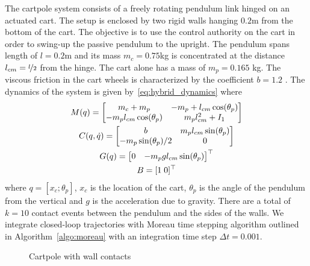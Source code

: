 The cartpole system consists of a freely rotating pendulum link hinged on an
actuated cart.
%
The setup is enclosed by two rigid walls hanging $0.2$m from the bottom of the
cart.
%
The objective is to use the control authority on the cart in order to swing-up
the passive pendulum to the upright.
%
The pendulum spans length of $l=0.2$m and its mass $m_c = 0.75$kg is
concentrated at the distance $l_{cm}=\nicefrac{l}{2}$ from the hinge.
%
The cart alone has a mass of $m_p=0.165$ kg. The viscous friction in the cart
wheels is characterized by the coefficient $b=1.2$ .
%
The dynamics of the system
is given by~\eqref{eq:hybrid_dynamics} where 
\begin{equation}
    \begin{gathered}
        M(q) = \begin{bmatrix}m_c + m_p & -m_p+l_{cm} \cos(\theta_p) \\
        -m_pl_{cm}\cos(\theta_p) & m_p l_{cm}^2+I_1\end{bmatrix} \\
        C(q, \dot{q}) = \begin{bmatrix}b  & m_pl_{cm}\sin(\theta_p) \\
                -m_p\sin(\theta_p)/2 & 0\end{bmatrix} \\
        G(q) = \begin{bmatrix}0 & -m_pg l_{cm} \sin(\theta_p)\end{bmatrix}^\top \\
        B = [1 \; 0]^\top
    \end{gathered}
\end{equation}
\noindent where $q = [x_c; \theta_p]$, $x_c$ is the location of the cart, $\theta_p$
is the angle of the pendulum from the vertical and $g$ is the acceleration due
to gravity. 
%
There are a total of $k=10$ contact events between the pendulum and the sides of
the walls.
%
We integrate closed-loop trajectories with Moreau time stepping algorithm
outlined in Algorithm~\eqref{algo:moreau} with an integration time step $\Delta
t=0.001$.
%



\begin{figure}[tb]
    \centering
    \caption{Cartpole with wall contacts}
    \label{fig:cartpole_contact}
\end{figure}


